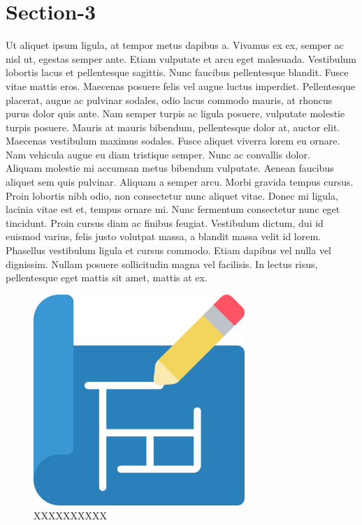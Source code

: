 \documentclass[12pt]{report}
\begin{document}
\section{Section-3}
\bigskip
Ut aliquet ipsum ligula, at tempor metus dapibus a. Vivamus ex ex, semper ac nisl ut, egestas semper ante. Etiam vulputate et arcu eget malesuada. Vestibulum lobortis lacus et pellentesque sagittis. Nunc faucibus pellentesque blandit. Fusce vitae mattis eros. Maecenas posuere felis vel augue luctus imperdiet. Pellentesque placerat, augue ac pulvinar sodales, odio lacus commodo mauris, at rhoncus purus dolor quis ante. Nam semper turpis ac ligula posuere, vulputate molestie turpis posuere. Mauris at mauris bibendum, pellentesque dolor at, auctor elit. Maecenas vestibulum maximus sodales. Fusce aliquet viverra lorem eu ornare. Nam vehicula augue eu diam tristique semper. Nunc ac convallis dolor.\\

\noindent Aliquam molestie mi accumsan metus bibendum vulputate. Aenean faucibus aliquet sem quis pulvinar. Aliquam a semper arcu. Morbi gravida tempus cursus. Proin lobortis nibh odio, non consectetur nunc aliquet vitae. Donec mi ligula, lacinia vitae est et, tempus ornare mi. Nunc fermentum consectetur nunc eget tincidunt. Proin cursus diam ac finibus feugiat. Vestibulum dictum, dui id euismod varius, felis justo volutpat massa, a blandit massa velit id lorem. Phasellus vestibulum ligula et cursus commodo. Etiam dapibus vel nulla vel dignissim. Nullam posuere sollicitudin magna vel facilisis. In lectus risus, pellentesque eget mattis sit amet, mattis at ex.\\

\bigskip


\begin{figure}[H] %
    \centering
    \includegraphics[width=80mm]{blueprint.png} %
    \caption{XXXXXXXXXX}
    \label{fig:img-2}
\end{figure}
\end{document}
